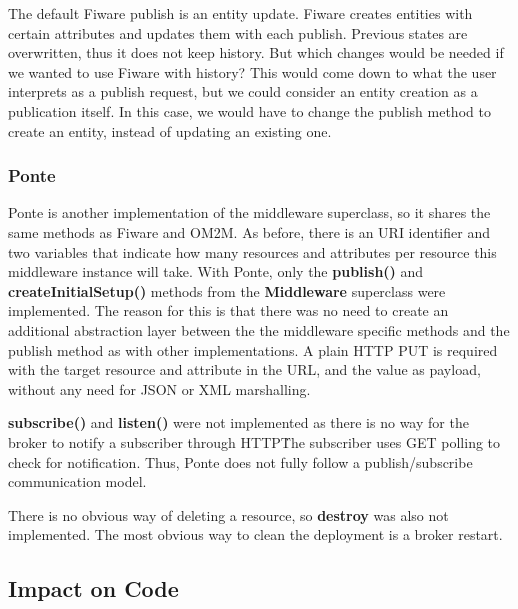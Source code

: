 \documentclass[conference]{IEEEtran}
\begin{document}
The default Fiware publish is an entity update. Fiware creates entities with certain attributes and updates them with each publish. Previous states are overwritten, thus it does not keep history. But which changes would be needed if we wanted to use Fiware with history? This would come down to what the user interprets as a publish request, but we could consider an entity creation as a publication itself. In this case, we would have to change the publish method to create an entity, instead of updating an existing one.

%
\subsubsection{Ponte}

Ponte is another implementation of the middleware superclass, so it shares the same methods as Fiware and OM2M.
As before, there is an URI identifier and two variables that indicate how many resources and attributes per resource this middleware instance will take. With Ponte, only the \textbf{publish()} and \textbf{createInitialSetup()} methods from the \textbf{Middleware} superclass were implemented. The reason for this is that there was no need to create an additional abstraction layer between the the middleware specific methods and the publish method as with other implementations. A plain HTTP PUT is required with the target resource and attribute in the URL, and the value as payload, without any need for JSON or XML marshalling.

\textbf{subscribe()} and \textbf{listen()} were not implemented as there is no way for the broker to notify a subscriber through HTTP\. The subscriber uses GET polling to check for notification. Thus, Ponte does not fully follow a publish/subscribe communication model.

There is no obvious way of deleting a resource, so \textbf{destroy} was also not implemented. The most obvious way to clean the deployment is a broker restart. 

\subsection{Impact on Code}
\end{document}

